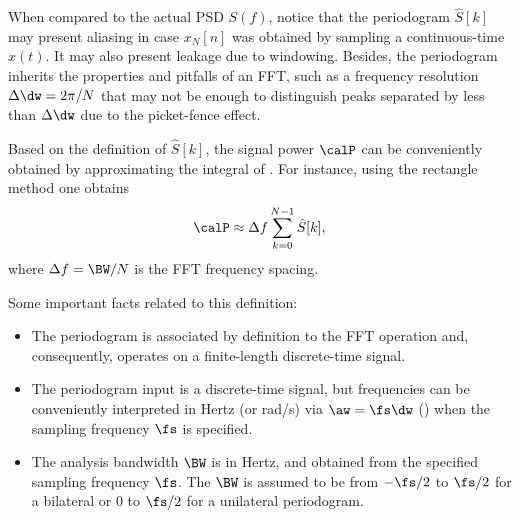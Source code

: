When compared to the actual PSD $S(f)$, notice that the periodogram $\hat S[k]$ may present aliasing in case $x_N[n]$ was obtained by sampling a continuous-time $x(t)$. It may also present leakage due to windowing. Besides, the
periodogram inherits the properties and pitfalls of an FFT, such as a frequency resolution $\Delta \dw = 2\pi / N$ that may not be enough to distinguish peaks separated by less than $\Delta \dw$ due to the picket-fence effect. 

Based on the definition of $\hat S[k]$, the signal power $\calP$ can be conveniently obtained by approximating the integral of . For instance, using the rectangle method one obtains
\begin{equation}
\calP \approx \Delta f \sum_{k=0}^{N-1} \hat S[k],
\label{eq:periodogram_discretetime3}
\end{equation}
where $\Delta f = \BW / N$ is the FFT frequency spacing.

Some important facts related to this definition:
\begin{itemize}
	\item The periodogram is associated by definition to the FFT operation and, consequently, operates on a finite-length discrete-time signal.
	\item The periodogram input is a discrete-time signal, but frequencies can be conveniently interpreted in Hertz (or rad/s) via $\aw = \fs \dw$ () when the sampling frequency $\fs$ is specified.
	\item The analysis bandwidth $\BW$ is in Hertz, and obtained from the specified sampling frequency $\fs$. The $\BW$ is assumed to be from $-\fs/2$ to $\fs/2$ for a bilateral or $0$ to $\fs/2$ for a unilateral periodogram.
\end{itemize}



